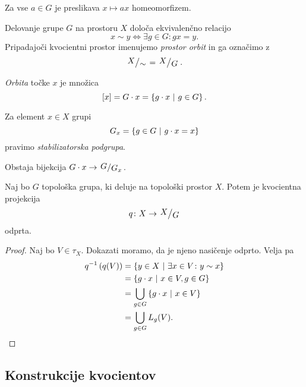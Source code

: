 \begin{opomba}
Za vse $a \in G$ je preslikava $x \mapsto ax$ homeomorfizem.
\end{opomba}

\begin{trditev}
Delovanje grupe $G$ na prostoru $X$ določa ekvivalenčno relacijo
\[
x \sim y \iff \exists g \in G \colon gx = y.
\]
Pripadajoči kvocientni prostor imenujemo
\emph{prostor orbit} in ga
označimo z
\[
\kvoc{X}{\sim} = \kvoc{X}{G}.
\]
\end{trditev}

\obvs

\begin{definicija}
\emph{Orbita} točke $x$ je množica
\[
[x] = G \cdot x = \left\{g \cdot x~\middle\vert~g \in G\right\}.
\]
\end{definicija}

\begin{definicija}
Za element $x \in X$ grupi
\[
G_x = \left\{g \in G~\middle\vert~g \cdot x = x\right\}
\]
pravimo
\emph{stabilizatorska podgrupa}.
\end{definicija}

\begin{opomba}
Obstaja bijekcija $G \cdot x \to \kvoc{G}{G_x}$.
\end{opomba}

\begin{trditev}
Naj bo $G$ topološka grupa, ki deluje na topološki prostor $X$.
Potem je kvocientna projekcija
\[
q \colon X \to \kvoc{X}{G}
\]
odprta.
\end{trditev}

\begin{proof}
Naj bo $V \in \tau_X$. Dokazati moramo, da je njeno nasičenje
odprto. Velja pa
\begin{align*}
q^{-1}\left(q(V)\right)
&=
\left\{y \in X~\middle\vert~\exists x \in V \colon y \sim x\right\}
\\
&=
\left\{g \cdot x~\middle\vert~x \in V, g \in G\right\}
\\
&=
\bigcup_{g \in G} \left\{g \cdot x~\middle\vert~x \in V\right\}
\\
&= \bigcup_{g \in G} L_g(V). \qedhere
\end{align*}
\end{proof}

\newpage

\subsection{Konstrukcije kvocientov}

